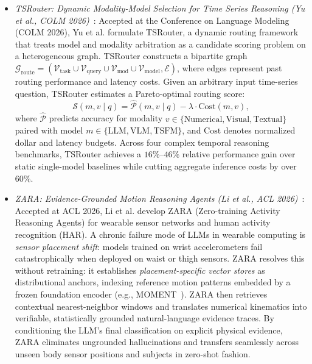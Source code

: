 \begin{itemize}[leftmargin=*]
    \item \emph{TSRouter: Dynamic Modality-Model Selection for Time Series Reasoning (Yu et al., COLM 2026)}~\cite{yu2026tsrouter}: Accepted at the Conference on Language Modeling (COLM 2026), Yu et al. formulate TSRouter, a dynamic routing framework that treats model and modality arbitration as a candidate scoring problem on a heterogeneous graph. TSRouter constructs a bipartite graph $\mathcal{G}_{\text{route}} = (\mathcal{V}_{\text{task}} \cup \mathcal{V}_{\text{query}} \cup \mathcal{V}_{\text{mod}} \cup \mathcal{V}_{\text{model}}, \mathcal{E})$, where edges represent past routing performance and latency costs. Given an arbitrary input time-series question, TSRouter estimates a Pareto-optimal routing score:
    \begin{equation}
        \mathcal{S}(m, v \mid q) = \hat{\mathcal{P}}(m, v \mid q) - \lambda \cdot \text{Cost}(m, v),
    \end{equation}
    where $\hat{\mathcal{P}}$ predicts accuracy for modality $v \in \{\text{Numerical}, \text{Visual}, \text{Textual}\}$ paired with model $m \in \{\text{LLM}, \text{VLM}, \text{TSFM}\}$, and $\text{Cost}$ denotes normalized dollar and latency budgets. Across four complex temporal reasoning benchmarks, TSRouter achieves a $16\%\text{--}46\%$ relative performance gain over static single-model baselines while cutting aggregate inference costs by over $60\%$.

    \item \emph{ZARA: Evidence-Grounded Motion Reasoning Agents (Li et al., ACL 2026)}~\cite{li2025zara}: Accepted at ACL 2026, Li et al. develop ZARA (Zero-training Activity Reasoning Agents) for wearable sensor networks and human activity recognition (HAR). A chronic failure mode of LLMs in wearable computing is \emph{sensor placement shift}: models trained on wrist accelerometers fail catastrophically when deployed on waist or thigh sensors. ZARA resolves this without retraining: it establishes \emph{placement-specific vector stores} as distributional anchors, indexing reference motion patterns embedded by a frozen foundation encoder (e.g., MOMENT~\cite{goswami2024moment}). ZARA then retrieves contextual nearest-neighbor windows and translates numerical kinematics into verifiable, statistically grounded natural-language evidence traces. By conditioning the LLM's final classification on explicit physical evidence, ZARA eliminates ungrounded hallucinations and transfers seamlessly across unseen body sensor positions and subjects in zero-shot fashion.
\end{itemize}

